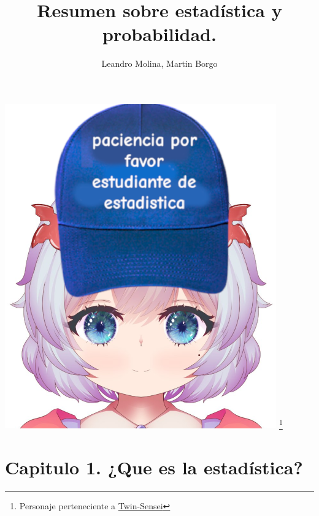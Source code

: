 \documentclass[]{article}
\title{Resumen sobre estadística y probabilidad.}
\author{Leandro Molina, Martin Borgo}
\begin{document}
\maketitle
\vspace{-20pt}

\noindent
\includegraphics[width=\linewidth, height=14cm]{imagenes/twin_estadistica.png}
\footnote{Personaje perteneciente a \href{https://www.youtube.com/@TwinSensei}{Twin-Sensei}}
\pagebreak

\tableofcontents


\pagebreak
\section{Capitulo 1. ¿Que es la estadística?}
\end{document}
